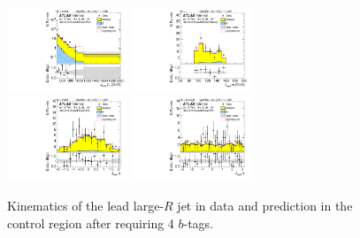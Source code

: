 \begin{figure}[htbp!]
\begin{center}
\includegraphics[width=0.32\textwidth,angle=-90]{figures/boosted/Control/b77_FourTag_Control_leadHCand_Pt_m_1.pdf}
\includegraphics[width=0.32\textwidth,angle=-90]{figures/boosted/Control/b77_FourTag_Control_leadHCand_Mass_s.pdf}\\
\includegraphics[width=0.32\textwidth,angle=-90]{figures/boosted/Control/b77_FourTag_Control_leadHCand_Eta.pdf}
\includegraphics[width=0.32\textwidth,angle=-90]{figures/boosted/Control/b77_FourTag_Control_leadHCand_Phi.pdf}
  \caption{Kinematics of the lead large-$R$ jet in data and prediction in the control region after requiring 4 $b$-tags. }
  \label{fig:boosted-4b-control-ak10-lead}
\end{center}
\end{figure}

